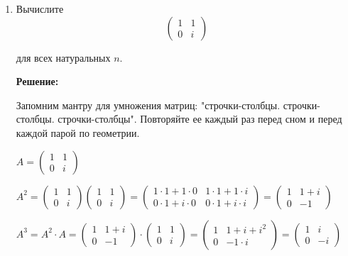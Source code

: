\documentclass[]{book}
\theoremstyle{definition}
\begin{document}
\begin{enumerate}[resume]

\item
Вычислите $$\left(
\begin{array}{cc}
1 & 1\\
0 & i 
\end{array}
\right)$$

для всех натуральных $n$.

\textbf{Решение:}

Запомним мантру для умножения матриц: "строчки-столбцы. строчки-столбцы. строчки-столбцы". Повторяйте ее каждый раз перед сном и перед каждой парой по геометрии.

$A =\left(
\begin{array}{cc}
1 & 1\\
0 & i 
\end{array}
\right)$

$A^2 = \left(
\begin{array}{cc}
1 & 1\\
0 & i 
\end{array}
\right)\left(
\begin{array}{cc}
1 & 1\\
0 & i 
\end{array}
\right) = 
\left(
\begin{array}{cc}
1\cdot 1 + 1\cdot0 & 1\cdot 1 + 1\cdot i\\
0\cdot 1 + i\cdot 0 & 0\cdot1 + i\cdot i 
\end{array}
\right) = 
\left(
\begin{array}{cc}
1 & 1 + i\\
0 & -1 
\end{array}
\right)
$

$A^3 = A^2\cdot A = \left(
\begin{array}{cc}
1 & 1 + i\\
0 & -1 
\end{array}
\right)\cdot\left(
\begin{array}{cc}
1 & 1\\
0 & i 
\end{array}
\right) = \left(
\begin{array}{cc}
1 & 1 + i + i^2\\
0 & -1\cdot i 
\end{array}
\right)=
\left(
\begin{array}{cc}
1 & i\\
0 & -i 
\end{array}
\right)$


\end{enumerate}
\end{document}
